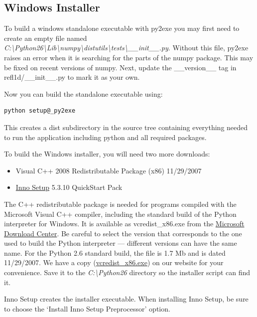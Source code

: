 \documentclass[letterpaper,10pt,english]{sphinxmanual}
\begin{document}
\subsection{Windows Installer}
\label{getting_started/install:windows-installer}
To build a windows standalone executable with py2exe you may first need
to create an empty file named
\emph{C:\textbackslash{}Python26\textbackslash{}Lib\textbackslash{}numpy\textbackslash{}distutils\textbackslash{}tests\textbackslash{}\_\_init\_\_.py}.
Without this file, py2exe raises an error when it is searching for
the parts of the numpy package.  This may be fixed on recent versions
of numpy. Next, update the \_\_version\_\_ tag in refl1d/\_\_init\_\_.py to mark
it as your own.

Now you can build the standalone executable using:

\begin{Verbatim}[commandchars=@\[\]]
python setup@_py2exe
\end{Verbatim}

This creates a dist subdirectory in the source tree containing
everything needed to run the application including python and
all required packages.

To build the Windows installer, you will need two more downloads:
\begin{itemize}
\item {} 
Visual C++ 2008 Redistributable Package (x86) 11/29/2007

\item {} 
\href{http://www.jrsoftware.org/isdl.php}{Inno Setup} 5.3.10 QuickStart Pack

\end{itemize}

The C++ redistributable package is needed for programs compiled with the
Microsoft Visual C++ compiler, including the standard build of the Python
interpreter for Windows.  It is available as vcredist\_x86.exe from the
\href{http://www.microsoft.com/downloads/}{Microsoft Download Center}.
Be careful to select the version that corresponds to the one used
to build the Python interpreter --- different versions can have the
same name.  For the Python 2.6 standard build, the file is 1.7 Mb
and is dated 11/29/2007.  We have a copy (\href{http://www.reflectometry.org/danse/download.php?file=vcredist\_x86.exe}{vcredist\_x86.exe}) on
our website for your convenience.  Save it to the \emph{C:\textbackslash{}Python26}
directory so the installer script can find it.

Inno Setup creates the installer executable.  When installing Inno Setup,
be sure to choose the `Install Inno Setup Preprocessor' option.
\end{document}
